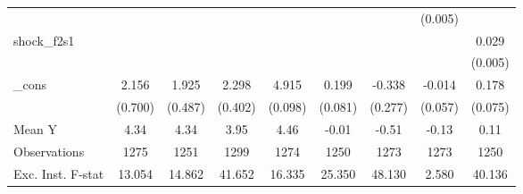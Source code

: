 {\begin{tabular}{l*{8}{c}}
            &                     &                     &                     &                     &                     &                     &     (0.005)         &                     \\
\addlinespace
shock\_f2s1  &                     &                     &                     &                     &                     &                     &                     &       0.029\sym{***}\\
            &                     &                     &                     &                     &                     &                     &                     &     (0.005)         \\
\addlinespace
\_cons      &       2.156\sym{***}&       1.925\sym{***}&       2.298\sym{***}&       4.915\sym{***}&       0.199\sym{**} &      -0.338         &      -0.014         &       0.178\sym{**} \\
            &     (0.700)         &     (0.487)         &     (0.402)         &     (0.098)         &     (0.081)         &     (0.277)         &     (0.057)         &     (0.075)         \\
\midrule
Mean Y      &        4.34         &        4.34         &        3.95         &        4.46         &       -0.01         &       -0.51         &       -0.13         &        0.11         \\
Observations&        1275         &        1251         &        1299         &        1274         &        1250         &        1273         &        1273         &        1250         \\
Exc. Inst. F-stat&      13.054         &      14.862         &      41.652         &      16.335         &      25.350         &      48.130         &       2.580         &      40.136         \\
\bottomrule
\end{tabular}
}
